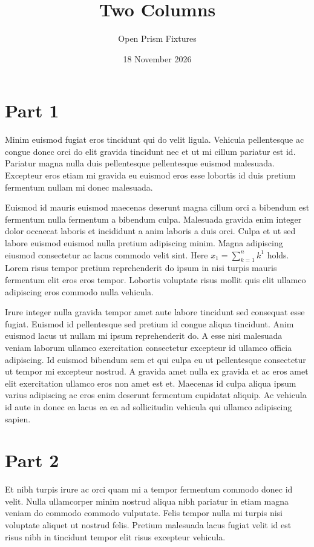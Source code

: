 \documentclass[10pt,a4paper,twocolumn]{article}
\title{Two Columns}
\author{Open Prism Fixtures}
\date{18 November 2026}
\begin{document}
\maketitle

\section{Part 1}
Minim euismod fugiat eros tincidunt qui do velit ligula.
Vehicula pellentesque ac congue donec orci do elit gravida
tincidunt nec et ut mi cillum pariatur est id. Pariatur
magna nulla duis pellentesque pellentesque euismod
malesuada. Excepteur eros etiam mi gravida eu euismod eros
esse lobortis id duis pretium fermentum nullam mi donec
malesuada.

Euismod id mauris euismod maecenas deserunt magna cillum
orci a bibendum est fermentum nulla fermentum a bibendum
culpa. Malesuada gravida enim integer dolor occaecat laboris
et incididunt a anim laboris a duis orci. Culpa et ut sed
labore euismod euismod nulla pretium adipiscing minim. Magna
adipiscing eiusmod consectetur ac lacus commodo velit sint.
Here $x_{1} = \sum_{k=1}^{n} k^{1}$ holds. Lorem risus
tempor pretium reprehenderit do ipsum in nisi turpis mauris
fermentum elit eros eros tempor. Lobortis voluptate risus
mollit quis elit ullamco adipiscing eros commodo nulla
vehicula.

Irure integer nulla gravida tempor amet aute labore
tincidunt sed consequat esse fugiat. Euismod id pellentesque
sed pretium id congue aliqua tincidunt. Anim euismod lacus
ut nullam mi ipsum reprehenderit do. A esse nisi malesuada
veniam laborum ullamco exercitation consectetur excepteur id
ullamco officia adipiscing. Id euismod bibendum sem et qui
culpa eu ut pellentesque consectetur ut tempor mi excepteur
nostrud. A gravida amet nulla ex gravida et ac eros amet
elit exercitation ullamco eros non amet est et. Maecenas id
culpa aliqua ipsum varius adipiscing ac eros enim deserunt
fermentum cupidatat aliquip. Ac vehicula id aute in donec ea
lacus ea ea ad sollicitudin vehicula qui ullamco adipiscing
sapien.

\section{Part 2}
Et nibh turpis irure ac orci quam mi a tempor fermentum
commodo donec id velit. Nulla ullamcorper minim nostrud
aliqua nibh pariatur in etiam magna veniam do commodo
commodo vulputate. Felis tempor nulla mi turpis nisi
voluptate aliquet ut nostrud felis. Pretium malesuada lacus
fugiat velit id est risus nibh in tincidunt tempor elit
risus excepteur vehicula.
\end{document}
